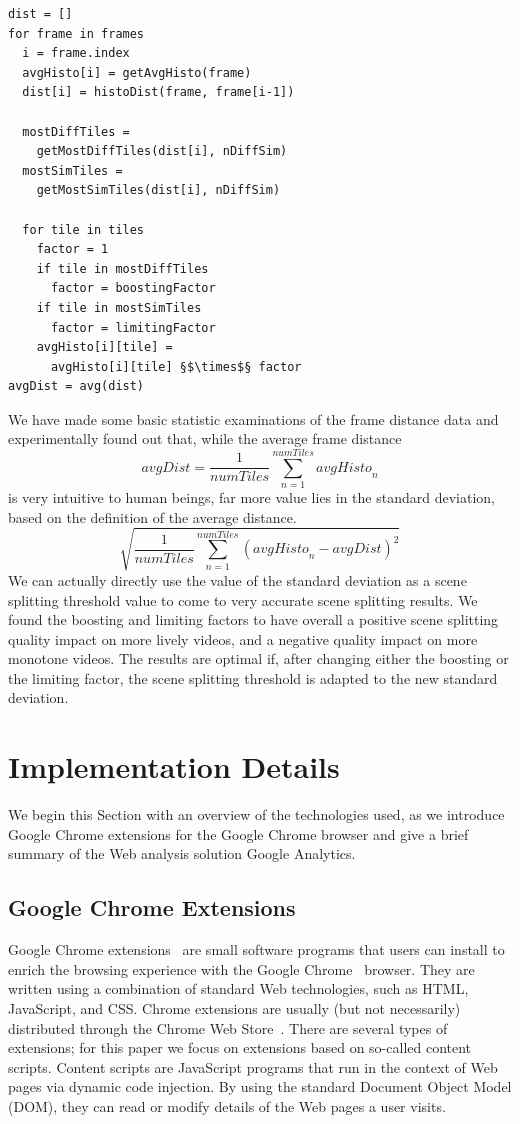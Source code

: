 \documentclass[10pt,twocolumn,letterpaper]{article}
\begin{document}
\begin{lstlisting}[caption=Pseudocode for our scene detection algorithm., label=code:algorithm, float]
dist = []
for frame in frames
  i = frame.index
  avgHisto[i] = getAvgHisto(frame)
  dist[i] = histoDist(frame, frame[i-1])

  mostDiffTiles =
    getMostDiffTiles(dist[i], nDiffSim)
  mostSimTiles =
    getMostSimTiles(dist[i], nDiffSim)

  for tile in tiles
    factor = 1
    if tile in mostDiffTiles
      factor = boostingFactor
    if tile in mostSimTiles
      factor = limitingFactor
    avgHisto[i][tile] =
      avgHisto[i][tile] §$\times$§ factor
avgDist = avg(dist)
\end{lstlisting}

We have made some basic statistic examinations of the frame distance data and experimentally found out that, while the average frame distance $$\mathit{avgDist} = \frac{1}{\mathit{numTiles}}\sum_{n=1}^{\mathit{numTiles}}\mathit{avgHisto}_{n}$$ is very intuitive to human beings, far more value lies in the standard deviation, based on the definition of the average distance. $$\sqrt{\frac{1}{\mathit{numTiles}}\sum_{n=1}^{\mathit{numTiles}}(\mathit{avgHisto}_{n} - \mathit{avgDist})^{2}}$$ We can actually directly use the value of the standard deviation as a scene splitting threshold value to come to very accurate scene splitting results. We found the boosting and limiting factors to have overall a positive scene splitting quality impact on more lively videos, and a negative quality impact on more monotone videos. The results are optimal if, after changing either the boosting or the limiting factor, the scene splitting threshold is adapted to the new standard deviation.

\section{Implementation Details} \label{sec:implementation}
We begin this Section with an overview of the technologies used, as we introduce Google Chrome extensions for the Google Chrome browser and give a brief summary of the Web analysis solution Google Analytics.

\subsection{Google Chrome Extensions}
Google Chrome extensions~\cite{chromeextensions} are small software programs that users can install to enrich the browsing experience with the Google Chrome~\cite{chrome} browser. They are written using a combination of standard Web technologies, such as HTML, JavaScript, and CSS. Chrome extensions are usually (but not necessarily) distributed through the Chrome Web Store~\cite{chromewebstore}. There are several types of extensions; for this paper we focus on extensions based on so-called content scripts. Content scripts are JavaScript programs that run in the context of Web pages via dynamic code injection. By using the standard Document Object Model (DOM), they can read or modify details of the Web pages a user visits.
\end{document}
